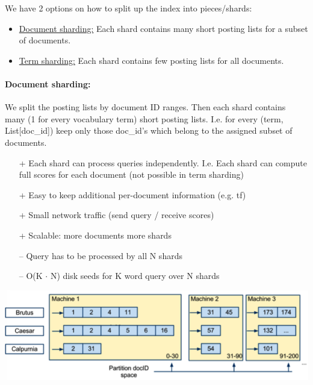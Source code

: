 \documentclass[a4paper,11pt]{article}
\begin{document}
\begin{multicols}{2}
We have 2 options on how to split up the index into pieces/shards:
\begin{itemize}
  \item \underline{Document sharding:} Each shard contains many short posting lists for a subset of documents.
  \item \underline{Term sharding:} Each shard contains few posting lists for all documents.
\end{itemize}

\paragraph{Document sharding:} We split the posting lists by document ID ranges. Then each shard contains many (1 for every vocabulary term) short posting lists. I.e. for every (term, List[doc\_id]) keep only those doc\_id's which belong to the assigned subset of documents. 
\begin{itemize}
  \item[+] Each shard can process queries independently. I.e. Each shard can compute full scores for each document (not possible in term sharding)
  \item[+] Easy to keep additional per-document information (e.g. tf)
  \item[+] Small network traffic (send query / receive scores) 
  \item[+] Scalable: more documents more shards
  \item[--] Query has to be processed by all N shards
  \item[--] O(K $\cdot$ N) disk seeds for K word query over N shards
\end{itemize}
\begin{center}
  \includegraphics[width=0.9\columnwidth]{document-shard.png}
\end{center}


\end{multicols}
\end{document}
